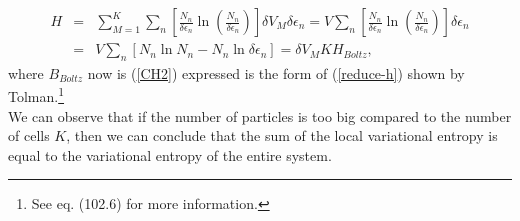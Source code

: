 \documentclass{article}
\newcommand{\de}{\delta}
\begin{document}
{\begin{eqnarray}
    H&=& \sum_{M=1}^{K} \sum_n
    \left[  
           \frac{N_{n}}{ \delta \epsilon_{n}} \ln 
           \left( 
                  \frac{N_{n}}{ \delta \epsilon_{n}}
           \right)
    \right]  \de V_M \delta \epsilon_{n} = V \sum_n
    \left[  
           \frac{N_{n}}{ \delta \epsilon_{n}} \ln 
           \left( 
                  \frac{N_{n}}{ \delta \epsilon_{n}}
           \right)
    \right] \delta \epsilon_{n} \nonumber \\
    &=& V \sum_n \left[N_n \ln N_n - N_n \ln \delta \epsilon_n  \right]=\de V_M K H_{Boltz},\label{h-quantic4}
\end{eqnarray}
where $B_{Boltz}$ now is (\ref{CH2}) expressed is the form of (\ref{reduce-h}) shown by Tolman.\footnote{See \cite{tolman} eq. (102.6) for more information.}\\
We can observe that if the number of particles is too big compared to the number of cells $K$, then we can conclude that the sum of the local variational entropy is equal to the variational entropy of the entire system.}

\end{document}
